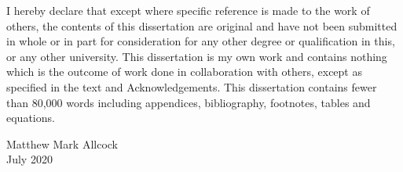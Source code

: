 \begin{declaration}
I hereby declare that except where specific reference is made to the work of others, the contents of this dissertation are original and have not been submitted in whole or in part for consideration for any other degree or qualification in this, or any other university. This dissertation is my own work and contains nothing which is the outcome of work done in collaboration with others, except as specified in the text and Acknowledgements. This dissertation contains fewer than 80,000 words including appendices, bibliography, footnotes, tables and equations.

\begin{flushright}
	Matthew Mark Allcock
	\\
	July 2020
\end{flushright}
\end{declaration}